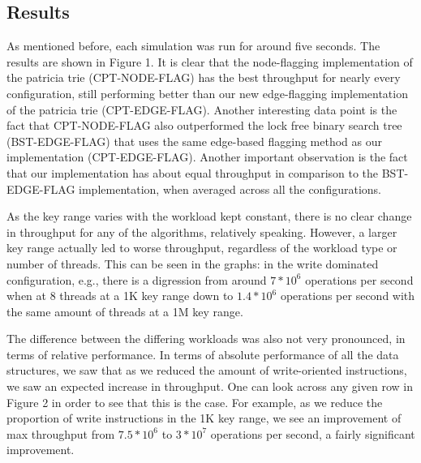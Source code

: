 \documentclass[conference]{IEEEtran}
\begin{document}
\subsection{Results}
As mentioned before, each simulation was run for around five seconds. The results are shown in Figure 1.
It is clear that the node-flagging implementation of the patricia trie (CPT-NODE-FLAG) has the best throughput for nearly every configuration, still performing better than our new edge-flagging implementation of the patricia trie (CPT-EDGE-FLAG). Another interesting data point is the fact that CPT-NODE-FLAG also outperformed the lock free binary search tree (BST-EDGE-FLAG) that uses the same edge-based flagging method as our implementation (CPT-EDGE-FLAG). Another important observation is the fact that our implementation has about equal throughput in comparison to the BST-EDGE-FLAG implementation, when averaged across all the configurations. 
\par
As the key range varies with the workload kept constant, there is no clear change in throughput for any of the algorithms, relatively speaking. However, a larger key range actually led to worse throughput, regardless of the workload type or number of threads. This can be seen in the graphs: in the write dominated configuration, e.g., there is a digression from around $7*10^6$ operations per second when at 8 threads at a 1K key range down to $1.4*10^6$ operations per second with the same amount of threads at a 1M key range.
\par
The difference between the differing workloads was also not very pronounced, in terms of relative performance. In terms of absolute performance of all the data structures, we saw that as we reduced the amount of write-oriented instructions, we saw an expected increase in throughput. One can look across any given row in Figure 2 in order to see that this is the case. For example, as we reduce the proportion of write instructions in the 1K key range, we see an improvement of max throughput from $7.5*10^6$ to $3*10^7$ operations per second, a fairly significant improvement. 
\end{document}
